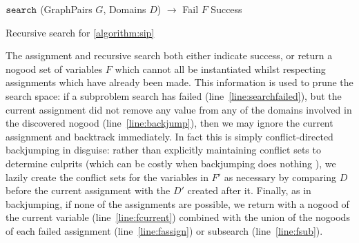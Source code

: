 \documentclass{llncs}
\newcommand{\lineref}[1]{line~\ref{#1}}
\begin{document}
\begin{algorithm}[h]
\DontPrintSemicolon
{}
\nl $\FuncSty{search}$ (GraphPairs $G$, Domains $D$) $\rightarrow$ Fail $F$  Success \;
\nl {}
\caption{Recursive search for \cref{algorithm:sip}}
\label{algorithm:search}
\end{algorithm}

The assignment and recursive search both either indicate success, or return a nogood set of
variables $F$ which cannot all be instantiated whilst respecting assignments which have already been
made. This information is used to prune the search space: if a subproblem search has failed
(\lineref{line:searchfailed}), but the current assignment did not remove any value from any of the
domains involved in the discovered nogood (\lineref{line:backjump}), then we may ignore the current
assignment and backtrack immediately.  In fact this is simply conflict-directed backjumping
\cite{Prosser:1993a} in disguise: rather than explicitly maintaining conflict sets to determine
culprits (which can be costly when backjumping does nothing \cite{Bessiere:1996,Gent:2010}), we
lazily create the conflict sets for the variables in $F'$ as necessary by comparing $D$ before the
current assignment with the $D'$ created after it. Finally, as in backjumping, if none of the
assignments are possible, we return with a nogood of the current variable (\lineref{line:fcurrent})
combined with the union of the nogoods of each failed assignment (\lineref{line:fassign}) or
subsearch (\lineref{line:fsub}).
\end{document}
